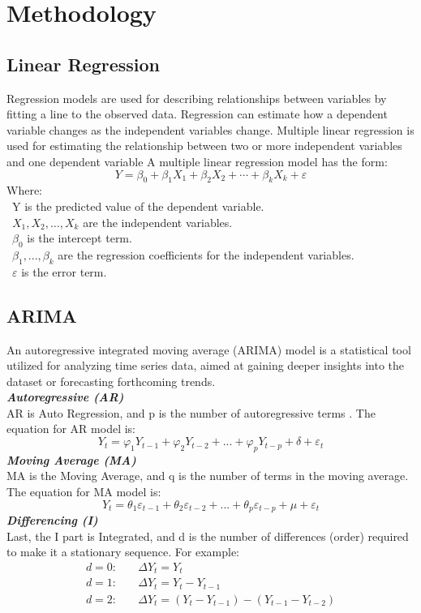 \documentclass{ieeeojies}
\begin{document}
\section{Methodology}
\subsection{Linear Regression} 
Regression models are used for describing relationships between variables by fitting a line to the observed data. Regression can estimate how a dependent variable changes as the independent variables change. Multiple linear regression is used for estimating the relationship between two or more independent variables and one dependent variable 
A multiple linear regression model has the form: \cite{b7}
\[Y=\beta_0+\beta_1X_1+\beta_2X_2+\cdots+\beta_kX_k+\varepsilon\]
Where:\\
	\indent\textbullet\ Y is the predicted value of the dependent variable.\\
	\indent\textbullet\ \(X_1, X_2, \ldots, X_k\) are the independent variables.\\
	\indent\textbullet\ \(\beta_0\) is the intercept term.\\
	\indent\textbullet\ \(\beta_1,..., \beta_k\) are the regression coefficients for the independent variables.\\
	\indent\textbullet\ \(\varepsilon\) is the error term.    

 \subsection{ARIMA} 
An autoregressive integrated moving average (ARIMA) model is a statistical tool utilized for analyzing time series data, aimed at gaining deeper insights into the dataset or forecasting forthcoming trends. \cite{b8}
\\
\textit{\textbf{Autoregressive (AR)}}
\\
AR is Auto Regression, and p is the number of autoregressive terms . The equation for AR model is: 
\[
Y_t = \varphi_1Y_{t-1} + \varphi_2Y_{t-2} + ... + \varphi_pY_{t-p} + \delta + \varepsilon_t
\]
\textit{\textbf{Moving Average (MA)}}
\\
MA is the Moving Average, and q is the number of terms in the moving average. The equation for MA model is:  
\[
Y_t = \theta_1\varepsilon_{t-1} + \theta_2\varepsilon_{t-2} + ... + \theta_p\varepsilon_{t-p} + \mu + \varepsilon_t  
\]
\textit{\textbf{Differencing (I) }}
\\
Last, the I part is Integrated, and d is the number of differences (order) required to make it a stationary sequence. For example:
\begin{align*}
    d=0: & \quad \Delta Y_t = Y_t \\
    d=1: & \quad \Delta Y_t = Y_t - Y_{t-1} \\
    d=2: & \quad \Delta Y_t = \left(Y_t - Y_{t-1}\right) - \left(Y_{t-1} - Y_{t-2}\right)
\end{align*}
\end{document}
